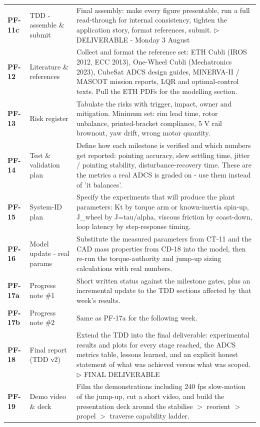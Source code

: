 {\begin{longtable}{@{}L{1.1cm} L{3.0cm} L{11.0cm}@{}}
\textbf{PF-11c} & TDD - assemble \& submit & Final assembly: make every figure presentable, run a full read-through for internal consistency, tighten the application story, format references, submit. \newline\textcolor{p0col}{\footnotesize$\triangleright$ DELIVERABLE - Monday 3 August} \\[2pt]
\textbf{PF-12} & Literature \& references & Collect and format the reference set: ETH Cubli (IROS 2012, ECC 2013), One-Wheel Cubli (Mechatronics 2023), CubeSat ADCS design guides, MINERVA-II / MASCOT mission reports, LQR and optimal-control texts. Pull the ETH PDFs for the modelling section. \\[2pt]
\textbf{PF-13} & Risk register & Tabulate the risks with trigger, impact, owner and mitigation. Minimum set: rim lead time, rotor unbalance, printed-bracket compliance, 5 V rail brownout, yaw drift, wrong motor quantity. \\[2pt]
\textbf{PF-14} & Test \& validation plan & Define how each milestone is verified and which numbers get reported: pointing accuracy, slew settling time, jitter / pointing stability, disturbance-recovery time. These are the metrics a real ADCS is graded on - use them instead of 'it balances'. \\[2pt]
\textbf{PF-15} & System-ID plan & Specify the experiments that will produce the plant parameters: Kt by torque arm or known-inertia spin-up, J\_wheel by J=tau/alpha, viscous friction by coast-down, loop latency by step-response timing. \\[2pt]
\textbf{PF-16} & Model update - real params & Substitute the measured parameters from CT-11 and the CAD mass properties from CD-18 into the model, then re-run the torque-authority and jump-up sizing calculations with real numbers. \\[2pt]
\textbf{PF-17a} & Progress note \#1 & Short written status against the milestone gates, plus an incremental update to the TDD sections affected by that week's results. \\[2pt]
\textbf{PF-17b} & Progress note \#2 & Same as PF-17a for the following week. \\[2pt]
\textbf{PF-18} & Final report (TDD v2) & Extend the TDD into the final deliverable: experimental results and plots for every stage reached, the ADCS metrics table, lessons learned, and an explicit honest statement of what was achieved versus what was scoped. \newline\textcolor{p0col}{\footnotesize$\triangleright$ FINAL DELIVERABLE} \\[2pt]
\textbf{PF-19} & Demo video \& deck & Film the demonstrations including 240 fps slow-motion of the jump-up, cut a short video, and build the presentation deck around the stabilise $>$ reorient $>$ propel $>$ traverse capability ladder. \\[2pt]
\end{longtable}
}

